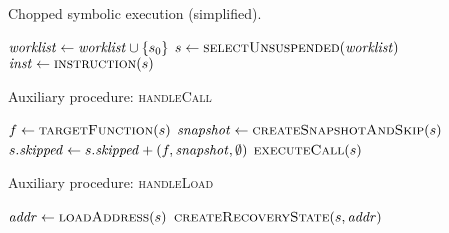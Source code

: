 
\begin{algorithm} %
\caption{Chopped symbolic execution (simplified).\label{fig:chopped-symbexe-recover}\label{fig:chopped-symbexe} }
\begin{algorithmic}[1]
  \State $\mathit{worklist} \gets \mathit{worklist} \cup \{ s_0\}$  \label{alg:seed-worklist}
  \While{$\worklist \neq \emptyset$}                     \label{alg:iterate-worklist}
    \State $\workstate \gets  \Call{selectUnsuspended}{\worklist}$ \label{alg:pop-worklist}
    \State $\inst \gets  \Call{instruction}{\workstate}$ \label{alg:get-switch-inst}

    \Switch{$\inst$} \label{alg:switch}
     \label{alg:casecall-begin}
    \EndCase \label{alg:casecall-end}
     \label{alg:caseload-begin}
    \EndCase \label{alg:caseload-end}
     \label{alg:casebranch-begin}
    \EndCase \label{alg:casebranch-end}
     \label{alg:casestore-begin}
    \EndCase \label{alg:casestore-end}
     \label{alg:caseexit-begin}
    \EndCase \label{alg:caseexit-end}
    \EndSwitch
  \EndWhile
  \EndFunction
\end{algorithmic}
\end{algorithm}

\begin{algorithm}
  \caption{Auxiliary procedure: \textsc{handleCall}
  \label{fig:aux-func-recS}}
\begin{algorithmic}[1]

\State $f \gets  \Call{targetFunction}{\workstate}$ \label{alg:call-find-target}
  \State $\snapshot \gets \Call{createSnapshotAndSkip}{\workstate}$ \label{alg:take-snapshot}
  \State $s.\mathit{skipped} \gets s.\mathit{skipped} + (f,\mathit{snapshot},\emptyset)$ \label{alg:record-snapshot}
\Else
  \State $\Call{executeCall}{\workstate}$ \label{alg:call-normal}
\EndIf
\EndFunction
\end{algorithmic}
\end{algorithm}

\begin{algorithm}
  \caption{Auxiliary procedure: \textsc{handleLoad}
  \label{fig:aux-func-recS}}
\begin{algorithmic}[1]

\State $\addr \gets \Call{loadAddress}{\workstate}$
  \State $\Call{createRecoveryState}{\workstate,\addr}$ \label{alg:call-recover}
\Else
  \State {}  \label{alg:load-normal}
\EndIf
\EndFunction
\end{algorithmic}
\end{algorithm}

